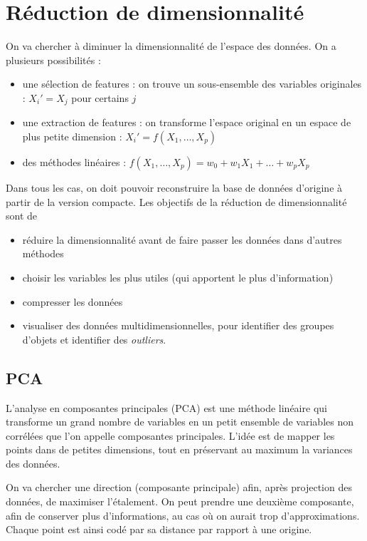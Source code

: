 	

\section{Réduction de dimensionnalité}

On va chercher à diminuer la dimensionnalité de l'espace des données. On a plusieurs possibilités :

\begin{itemize}
	\item une sélection de features : on trouve un sous-ensemble des variables originales : $X_i' = X_j$ pour certains $j$
	\item une extraction de features : on transforme l'espace original en un espace de plus petite dimension : $X_i' = f(X_1, \dots , X_p)$
	\item des méthodes linéaires : $f(X_1, \dots , X_p) = w_0 + w_1 X_1 + \dots + w_p X_p$
\end{itemize}

Dans tous les cas, on doit pouvoir reconstruire la base de données d'origine à partir de la version compacte. Les objectifs de la réduction de dimensionnalité sont de

\begin{itemize}
	\item réduire la dimensionnalité avant de faire passer les données dans d'autres méthodes
	\item choisir les variables les plus utiles (qui apportent le plus d'information)
	\item compresser les données
	\item visualiser des données multidimensionnelles, pour identifier des groupes d'objets et identifier des \textit{outliers}.
\end{itemize}

	\subsection{PCA}
	
	L'analyse en composantes principales (PCA) est une méthode linéaire qui transforme un grand nombre de variables en un petit ensemble de variables non corrélées que l'on appelle composantes principales. L'idée est de mapper les points dans de petites dimensions, tout en préservant au maximum la variances des données.
	
	On va chercher une direction (composante principale) afin, après projection des données, de maximiser l'étalement. On peut prendre une deuxième composante, afin de conserver plus d'informations, au cas où on aurait trop d'approximations. Chaque point est ainsi codé par sa distance par rapport à une origine.
	
